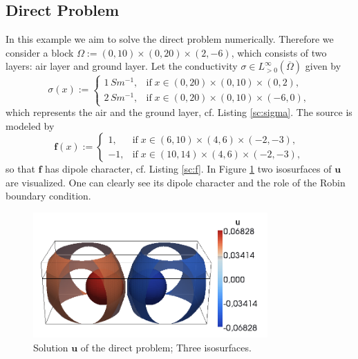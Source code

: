\documentclass[a4paper, 11pt, twoside]{article}
\begin{document}
\subsection{Direct Problem}\label{sectionfirstexample}
%
In this example we aim to solve the direct problem numerically. Therefore we consider a block $\Omega:=(0,10)\times(0,20)\times(2,-6)$, which consists of two layers: air layer and ground layer. Let the conductivity $\sigma\in L^\infty_{>0}(\overline{\Omega})$ given by 
%
\begin{equation}
	\sigma(x):=\left\{\begin{array}{ll}
	1\,Sm^{-1}, & \text{if}\;x\in(0,20)\times(0,10)\times(0,2),\\
	2\,Sm^{-1}, & \text{if}\;x\in(0,20)\times(0,10)\times(-6,0),
	\end{array}\right.
\end{equation}
%
which represents the air and the ground layer, cf. Listing \ref{sc:sigma}. The source is modeled by 
%
\begin{equation}
	\boldsymbol{f}(x):=\left\{\begin{array}{ll}
	1, & \text{if}\;x\in(6,10)\times(4,6)\times(-2,-3),\\
	-1, & \text{if}\;x\in(10,14)\times(4,6)\times(-2,-3),
	\end{array}\right.
\end{equation}
%
so that $\boldsymbol{f}$ has dipole character, cf. Listing \ref{sc:f}. In Figure \ref{u_solution} two isosurfaces of $\boldsymbol{u}$ are visualized. One can clearly see its dipole character and the role of the Robin boundary condition.

\begin{figure}[h!]
	\centering
		\includegraphics[width=0.8\textwidth]{fig/u_direct.png}
\caption{Solution $\boldsymbol{u}$ of the direct problem; Three isosurfaces.}
\label{u_solution}
\end{figure}
\end{document}
